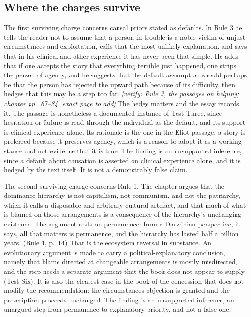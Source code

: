 \documentclass[12pt]{article}
\newif\ifverify\verifytrue
\newcommand{\passage}[1]{\ifverify{\footnotesize\color{gray}\textit{[verify: #1]}}\fi}
\begin{document}
\subsection*{Where the charges survive}

The first surviving charge concerns causal priors stated as defaults. In Rule 3 he tells the reader not to assume that a person in trouble is a noble victim of unjust circumstances and exploitation, calls that the most unlikely explanation, and says that in his clinical and other experience it has never been that simple. He adds that if one accepts the story that everything terrible just happened, one strips the person of agency, and he suggests that the default assumption should perhaps be that the person has rejected the upward path because of its difficulty, then hedges that this may be a step too far. \passage{Rule 3, the passages on helping; chapter pp.~67--84, exact page to add} The hedge matters and the essay records it. The passage is nonetheless a documented instance of Test Three, since hesitation or failure is read through the individual as the default, and its support is clinical experience alone. Its rationale is the one in the Eliot passage: a story is preferred because it preserves agency, which is a reason to adopt it as a working stance and not evidence that it is true. The finding is an unsupported inference, since a default about causation is asserted on clinical experience alone, and it is hedged by the text itself. It is not a demonstrably false claim.

The second surviving charge concerns Rule 1. The chapter argues that the dominance hierarchy is not capitalism, not communism, and not the patriarchy, which it calls a disposable and arbitrary cultural artefact, and that much of what is blamed on those arrangements is a consequence of the hierarchy's unchanging existence. The argument rests on permanence: from a Darwinian perspective, it says, all that matters is permanence, and the hierarchy has lasted half a billion years. (Rule 1, p.~14) That is the ecosystem reversal in substance. An evolutionary argument is made to carry a political-explanatory conclusion, namely that blame directed at changeable arrangements is mostly misdirected, and the step needs a separate argument that the book does not appear to supply (Test Six). It is also the clearest case in the book of the concession that does not modify the recommendation: the circumstances objection is granted and the prescription proceeds unchanged. The finding is an unsupported inference, an unargued step from permanence to explanatory priority, and not a false one.
\end{document}
